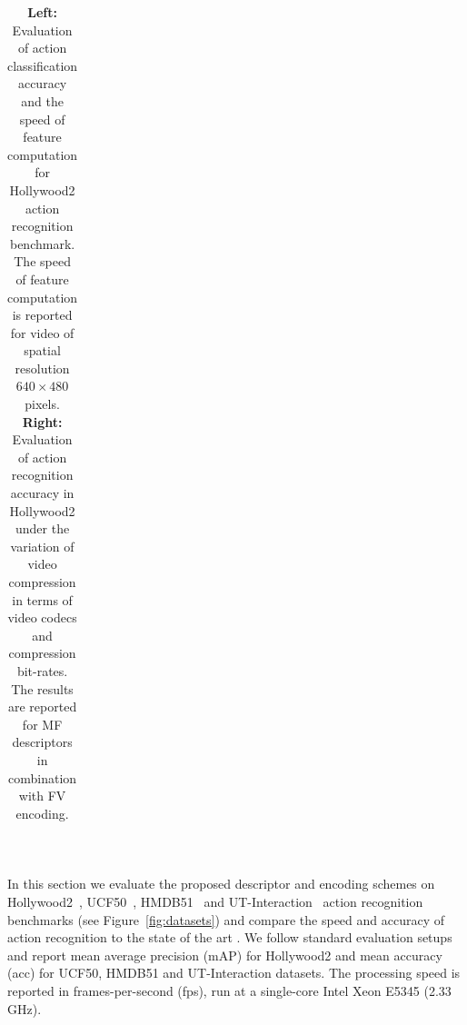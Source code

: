 \documentclass[10pt,twocolumn,letterpaper]{article}
\begin{document}
\begin{table}[t!]
\begin{center}
\begin{tabular}{p{}p{}}
\end{tabular}
\mbox{}\vspace{.1cm}\\
\caption{{\bf Left:} Evaluation of action classification accuracy and the speed of feature computation for Hollywood2 action recognition benchmark. The speed of feature computation is reported for video of spatial resolution $640\times480$ pixels. {\bf Right:} Evaluation of action recognition accuracy in Hollywood2 under the variation of video compression in terms of video codecs and compression bit-rates. The results are reported for MF descriptors in combination with FV encoding.\vspace{-.2cm}}
\label{tab:HWD2}
\end{center}
\end{table}


In this section we evaluate the proposed descriptor and encoding schemes on Hollywood2~\cite{Marszalek09}, UCF50~\cite{Reddy12}, HMDB51~\cite{Kuehne11} and UT-Interaction~\cite{Ryoo10} action recognition benchmarks (see Figure~\ref{fig:datasets}) and compare the speed and accuracy of action recognition  to the state of the art \cite{Wang12}. We follow standard evaluation setups and report mean average precision (mAP) for Hollywood2 and mean accuracy (acc) for UCF50, HMDB51 and UT-Interaction datasets. The processing speed is reported in frames-per-second (fps), run at a single-core Intel Xeon E5345 (2.33 GHz).
\end{document}
